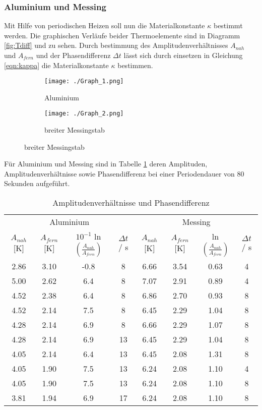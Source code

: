 \subsubsection{Aluminium und Messing}
Mit Hilfe von periodischen Heizen soll nun die Materialkonstante $\kappa$ bestimmt werden. Die graphischen Verläufe beider Thermoelemente sind in Diagramm \ref{fig:Tdiff}  und  zu sehen. Durch bestimmung des Amplitudenverhältnisses $A_{nah}$ und $A_{fern}$ und der Phasendifferenz $\Delta t$ lässt sich durch einsetzen in Gleichung \ref{eqn:kappa} die Materialkonstante $\kappa$ bestimmen. 
\begin{figure}
        \centering
        \caption{Temperatur der Thermoelemente bei periodischem Heizem}
        \label{fig:Tdiff}
	\begin{subfigure}{0.48\textwidth}
                \centering
                \texttt{[image: ./Graph\_1.png]}
                \caption{Aluminium}
		\label{fig:Graph1}
        \end{subfigure}
        \begin{subfigure}{0.48\textwidth}
                \centering
                \texttt{[image: ./Graph\_2.png]}
                \caption{breiter Messingstab}
		\label{fig:Graph2}
        \end{subfigure}
\end{figure}
Für Aluminium und Messing sind in Tabelle \ref{tab:AuP} deren Amplituden, Amplitudenverhältnisse sowie Phasendifferenz bei einer Periodendauer von 80 Sekunden aufgeführt. 
\begin{table}
	\centering
	\caption{Amplitudenverhältnisse und Phasendifferenz}
	\label{tab:AuP}
	\begin{tabular}{c c c c c c c c}
		\toprule
		\multicolumn{4}{c}{Aluminium} & \multicolumn{4}{c}{Messing}\\
		$A_{nah}$ [K] & $A_{fern}$ [K] & $10^{-1}$ ln $ \left(\frac{A_{nah}}{A_{fern}} \right)$ & $\Delta t$ / s & $A_{nah}$ [K] & $A_{fern}$ [K] & ln $ \left( \frac{A_{nah}}{A_{fern}} \right) $& $\Delta t$ / s \\
		\midrule
		2.86 & 3.10 & -0.8 & 8  & 6.66 & 3.54 & 0.63 & 4 \\
		5.00 & 2.62 &  6.4 & 8  & 7.07 & 2.91 & 0.89 & 4 \\
		4.52 & 2.38 &  6.4 & 8  & 6.86 & 2.70 & 0.93 & 8 \\ 
		4.52 & 2.14 &  7.5 & 8  & 6.45 & 2.29 & 1.04 & 8 \\
		4.28 & 2.14 &  6.9 & 8  & 6.66 & 2.29 & 1.07 & 8 \\
		4.28 & 2.14 &  6.9 & 13 & 6.45 & 2.29 & 1.04 & 8 \\
		4.05 & 2.14 &  6.4 & 13 & 6.45 & 2.08 & 1.31 & 8 \\
		4.05 & 1.90 &  7.5 & 13 & 6.24 & 2.08 & 1.10 & 4 \\
		4.05 & 1.90 &  7.5 & 13 & 6.24 & 2.08 & 1.10 & 8 \\ 
		3.81 & 1.94 &  6.9 & 17 & 6.24 & 2.08 & 1.10 & 8 \\
		\bottomrule
	\end{tabular}
\end{table}		
